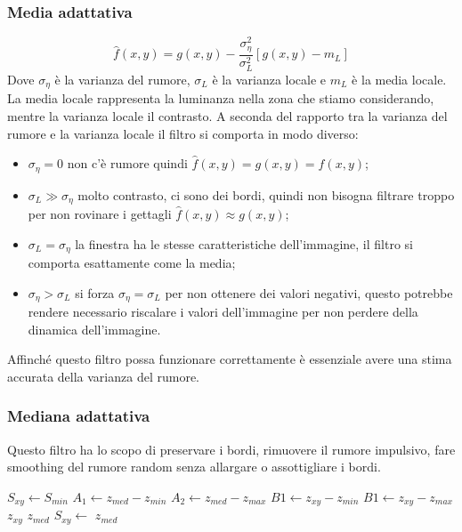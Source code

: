 \subsubsection{Media adattativa}
	\begin{equation}
		\hat{f}(x,y) = g(x,y) - \frac{\sigma_{\eta}^2}{\sigma_L^2}[g(x,y) - m_L]
	\end{equation}
Dove $\sigma_{\eta}$ è la varianza del rumore, $\sigma_L$ è la varianza locale e $m_L$ è la media locale. La media locale rappresenta la luminanza nella zona che stiamo considerando, mentre la varianza locale il contrasto. 
\newpage
A seconda del rapporto tra la varianza del rumore e la varianza locale il filtro si comporta in modo diverso:
\begin{itemize}
	\item $\sigma_{\eta} = 0$ non c'è rumore quindi $\hat{f}(x,y) = g(x,y) = f(x,y)$;
	\item $\sigma_L \gg \sigma_{\eta}$ molto contrasto, ci sono dei bordi, quindi non bisogna filtrare troppo per non rovinare i gettagli $\hat{f}(x,y) \approx g(x,y)$;
	\item $\sigma_L = \sigma_{\eta}$ la finestra ha le stesse caratteristiche dell'immagine, il filtro si comporta esattamente come la media;
	\item $\sigma_{\eta} > \sigma_L$ si forza $\sigma_{\eta} = \sigma_L$ per non ottenere dei valori negativi, questo potrebbe rendere necessario riscalare i valori dell'immagine per non perdere della dinamica dell'immagine.
\end{itemize}

Affinché questo filtro possa funzionare correttamente è essenziale avere una stima accurata della varianza del rumore.

\subsubsection{Mediana adattativa}
Questo filtro ha lo scopo di preservare i bordi, rimuovere il rumore impulsivo, fare smoothing del rumore random senza allargare o assottigliare i bordi.
\vspace{.5cm}

\begin{algorithmic}
		\State $S_{xy} \gets S_{min}$
			\State $A_1 \gets z_{med} - z_{min}$
			\State $A_2 \gets z_{med} - z_{max}$
				\State $B1 \gets z_{xy} - z_{min}$
				\State $B1 \gets z_{xy} - z_{max}$
					\State \Return $z_{xy}$
				\Else
					\State \Return $z_{med}$
				\EndIf
			\Else
				\State $S_{xy} \gets$ 
			\EndIf
		\EndWhile
		\State \Return $z_{med}$
	\EndFunction    
\end{algorithmic}

